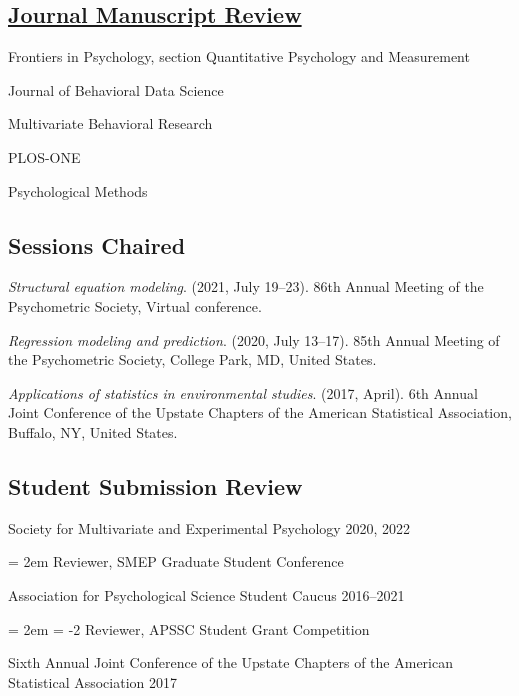 \documentclass[
  12 pt,
]{article}
\begin{document}
\hypertarget{journal-manuscript-review}{%
\subsection{\texorpdfstring{\href{https://publons.com/researcher/3552151/kenneth-tyler-wilcox/}{Journal
Manuscript
Review}}{Journal Manuscript Review}}\label{journal-manuscript-review}}

Frontiers in Psychology, section Quantitative Psychology and Measurement

Journal of Behavioral Data Science

Multivariate Behavioral Research

PLOS-ONE

Psychological Methods

\hypertarget{sessions-chaired}{%
\subsection{Sessions Chaired}\label{sessions-chaired}}

\emph{Structural equation modeling}. (2021, July 19--23). 86th Annual
Meeting of the Psychometric Society, Virtual conference.

\emph{Regression modeling and prediction}. (2020, July 13--17). 85th
Annual Meeting of the Psychometric Society, College Park, MD, United
States.

\emph{Applications of statistics in environmental studies}. (2017,
April). 6th Annual Joint Conference of the Upstate Chapters of the
American Statistical Association, Buffalo, NY, United States.

\hypertarget{student-submission-review}{%
\subsection{Student Submission Review}\label{student-submission-review}}

Society for Multivariate and Experimental Psychology \hfill 2020, 2022

\hangindent = 2em  Reviewer, SMEP Graduate Student
Conference

Association for Psychological Science Student Caucus \hfill 2016--2021

\hangindent = 2em \hangafter = -2 Reviewer, APSSC Student Grant
Competition

Sixth Annual Joint Conference of the Upstate Chapters of the American
Statistical Association \hfill 2017
\end{document}
